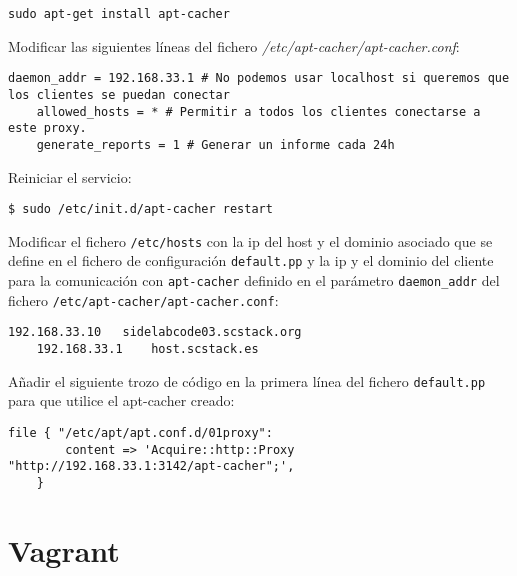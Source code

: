 \lstset{style=bashbasico}
\begin{lstlisting}[frame=trbl]
    sudo apt-get install apt-cacher
\end{lstlisting}

\par Modificar las siguientes líneas del fichero \emph{/etc/apt-cacher/apt-cacher.conf}:

\lstset{style=rubybasico}
\begin{lstlisting}[frame=trbl]
    daemon_addr = 192.168.33.1 # No podemos usar localhost si queremos que los clientes se puedan conectar
    allowed_hosts = * # Permitir a todos los clientes conectarse a este proxy.
    generate_reports = 1 # Generar un informe cada 24h
\end{lstlisting}

\par Reiniciar el servicio:

\lstset{style=bashbasico}
\begin{lstlisting}[frame=trbl]
    $ sudo /etc/init.d/apt-cacher restart
\end{lstlisting}

\par Modificar el fichero \texttt{/etc/hosts} con la ip del host y el dominio asociado que se define en el fichero de configuración \texttt{default.pp} y la ip y el dominio del cliente para la comunicación con \texttt{apt-cacher} definido en el parámetro \texttt{daemon\_addr} del fichero \texttt{/etc/apt-cacher/apt-cacher.conf}:

\lstset{style=rubybasico}
\begin{lstlisting}[frame=trbl]
    192.168.33.10   sidelabcode03.scstack.org
    192.168.33.1    host.scstack.es
\end{lstlisting}

\par Añadir el siguiente trozo de código en la primera línea del fichero \texttt{default.pp} para que utilice el apt-cacher creado:

\lstset{style=rubybasico}
\begin{lstlisting}[frame=trbl]
    file { "/etc/apt/apt.conf.d/01proxy":
        content => 'Acquire::http::Proxy "http://192.168.33.1:3142/apt-cacher";',
    }
\end{lstlisting}

\section{Vagrant}
\label{sec:vagrant}

